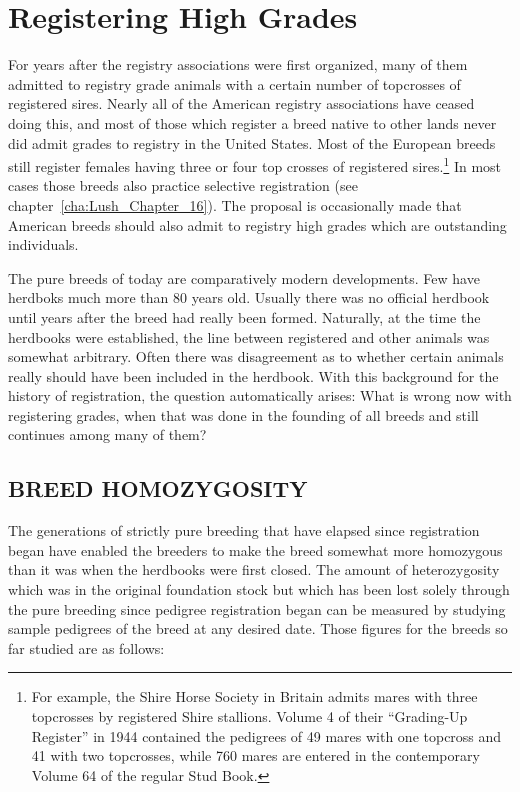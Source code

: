 \chapter{Registering High Grades}
\label{cha:Lush_Chapter_30}

For years after the registry associations were first organized, many of
them admitted to registry grade animals with a certain number of topcrosses
of registered sires. Nearly all of the American registry associations
have ceased doing this, and most of those which register a breed
native to other lands never did admit grades to registry in the United
States. Most of the European breeds still register females having three
or four top crosses of registered sires.\footnote{For example, the Shire
Horse Society in Britain admits mares with three topcrosses by registered
Shire stallions. Volume 4 of their ``Grading-Up Register'' in  1944
contained the pedigrees of 49 mares with one topcross and 41 with two
topcrosses, while 760 mares are entered in the contemporary Volume 64 of
the regular Stud Book.} In most cases those breeds also practice selective
registration (see chapter~\ref{cha:Lush_Chapter_16}). The proposal is
occasionally made that American breeds should also admit to registry high
grades which are outstanding individuals.

The pure breeds of today are comparatively modern developments.
Few have herdboks much more than 80 years old. Usually there was
no official herdbook until years after the breed had really been formed.
Naturally, at the time the herdbooks were established, the line between
registered and other animals was somewhat arbitrary. Often there was
disagreement as to whether certain animals really should have been
included in the herdbook. With this background for the history of
registration, the question automatically arises: What is wrong now
with registering grades, when that was done in the founding of all
breeds and still continues among many of them?

\section*{BREED HOMOZYGOSITY}

The generations of strictly pure breeding that have elapsed since
registration began have enabled the breeders to make the breed somewhat
more homozygous than it was when the herdbooks were first
closed. The amount of heterozygosity which was in the original
foundation stock but which has been lost solely through the pure breeding
since pedigree registration began can be measured by studying sample
pedigrees of the breed at any desired date. Those figures for the breeds
so far studied are as follows:

